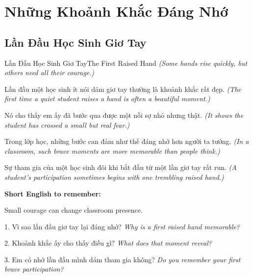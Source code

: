 \chapter{Những Khoảnh Khắc Đáng Nhớ}

\section{Lần Đầu Học Sinh Giơ Tay}
\begin{truyen}{Lần Đầu Học Sinh Giơ Tay}{The First Raised Hand}
\textit{(Some hands rise quickly, but others need all their courage.)}

Lần đầu một học sinh ít nói dám giơ tay thường là khoảnh khắc rất đẹp.
\textit{(The first time a quiet student raises a hand is often a beautiful moment.)}

Nó cho thấy em ấy đã bước qua được một nỗi sợ nhỏ nhưng thật.
\textit{(It shows the student has crossed a small but real fear.)}

Trong lớp học, những bước can đảm như thế đáng nhớ hơn người ta tưởng.
\textit{(In a classroom, such brave moments are more memorable than people think.)}
\end{truyen}

\begin{baihoc}
Sự tham gia của một học sinh đôi khi bắt đầu từ một lần giơ tay rất run.
\textit{(A student's participation sometimes begins with one trembling raised hand.)}
\end{baihoc}

\begin{ghinhoanh}
\textbf{Short English to remember:}

Small courage can change classroom presence.

\end{ghinhoanh}

\begin{tuhocnhanh}
1. Vì sao lần đầu giơ tay lại đáng nhớ? \textit{Why is a first raised hand memorable?}

2. Khoảnh khắc ấy cho thấy điều gì? \textit{What does that moment reveal?}

3. Em có nhớ lần đầu mình dám tham gia không? \textit{Do you remember your first brave participation?}
\end{tuhocnhanh}
\ngancach

